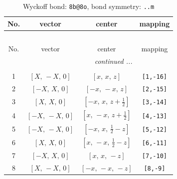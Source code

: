 \documentclass[fleqn,8pt]{jsarticle}
\begin{document}
\begin{longtable}{cccc}
\caption{Wyckoff bond: {\tt 8b@8o}, bond symmetry: {\tt ..m}}
 \\
 \hline \hline
No. & vector & center & mapping \\ \hline \endfirsthead

\multicolumn{3}{l}{\tablename\ \thetable{}} \\
 \hline \hline
No. & vector & center & mapping \\ \hline \endhead

 \hline \hline
\multicolumn{3}{r}{\footnotesize\it continued ...} \\ \endfoot

 \hline \hline
\multicolumn{3}{r}{} \\ \endlastfoot

1 & $\left[ X,\, - X,\, 0 \right]$ & $\left[ x,\, x,\, z \right]$ & {\tt [1,-16]} \\ \hline
2 & $\left[ - X,\, X,\, 0 \right]$ & $\left[ - x,\, - x,\, z \right]$ & {\tt [2,-15]} \\ \hline
3 & $\left[ X,\, X,\, 0 \right]$ & $\left[ - x,\, x,\, z + \frac{1}{2} \right]$ & {\tt [3,-14]} \\ \hline
4 & $\left[ - X,\, - X,\, 0 \right]$ & $\left[ x,\, - x,\, z + \frac{1}{2} \right]$ & {\tt [4,-13]} \\ \hline
5 & $\left[ - X,\, - X,\, 0 \right]$ & $\left[ - x,\, x,\, \frac{1}{2} - z \right]$ & {\tt [5,-12]} \\ \hline
6 & $\left[ X,\, X,\, 0 \right]$ & $\left[ x,\, - x,\, \frac{1}{2} - z \right]$ & {\tt [6,-11]} \\ \hline
7 & $\left[ - X,\, X,\, 0 \right]$ & $\left[ x,\, x,\, - z \right]$ & {\tt [7,-10]} \\ \hline
8 & $\left[ X,\, - X,\, 0 \right]$ & $\left[ - x,\, - x,\, - z \right]$ & {\tt [8,-9]} \\
\end{longtable}
\renewcommand{\arraystretch}{1.2}
\end{document}
